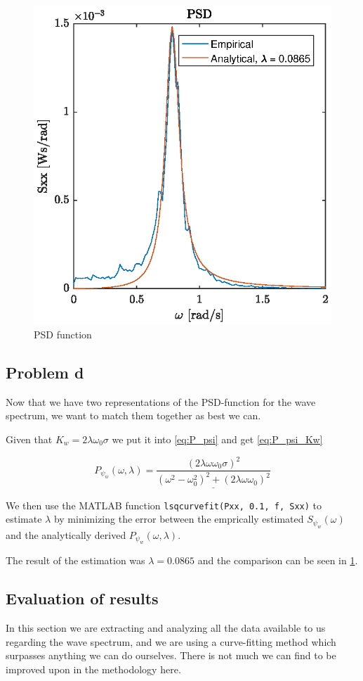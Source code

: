 \begin{figure}
	\centering
	\includegraphics{figures/Ass2_PSD.eps}
	\caption{PSD function}
\label{fig:p5p2_PSD}
\end{figure}

\subsection{Problem d}
Now that we have two representations of the PSD-function for the wave spectrum, we want to match them together as best we can.

Given that $K_w = 2 \lambda \omega_0 \sigma$ we put it into \cref{eq:P_psi} and get \cref{eq:P_psi_Kw}

\begin{equation} \label{eq:P_psi_Kw}
    P_{\psi_w}(\omega, \lambda) = \underline{\frac{(2 \lambda \omega \omega_0 \sigma)^2}{(\omega^2-\omega_0^2)^2 +(2\lambda \omega \omega_0)^2}}
\end{equation}

We then use the MATLAB function \texttt{lsqcurvefit(Pxx, 0.1, f, Sxx)} to estimate $\lambda$ by minimizing the error between the emprically estimated $S_{\psi_w}(\omega)$ and the analytically derived $P_{\psi_w}(\omega, \lambda)$.

The result of the estimation was $\lambda = 0.0865$ and the comparison can be seen in \cref{fig:p5p2_PSD}.

\subsection{Evaluation of results}

In this section we are extracting and analyzing all the data available to us regarding the wave spectrum, and we are using a curve-fitting method which surpasses anything we can do ourselves. There is not much we can find to be improved upon in the methodology here.